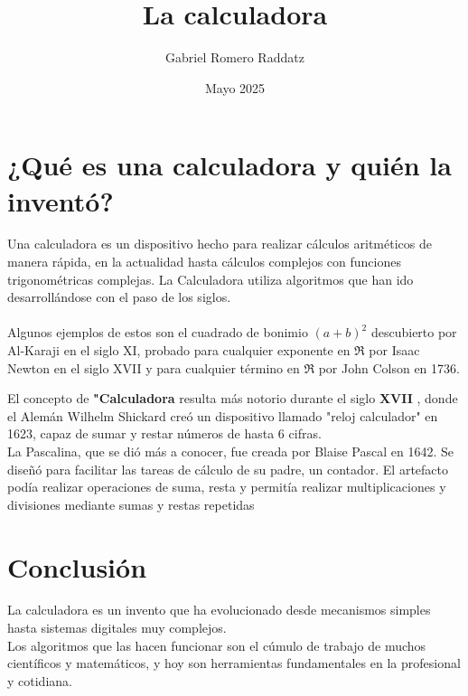 \documentclass[12pt]{article}
\title{\textbf{\huge La calculadora}}
\author{ Gabriel Romero Raddatz}
\date{Mayo 2025}
\begin{document}
\maketitle

\section{¿Qué es una calculadora y quién la inventó?}

\begin{lef}
    
Una calculadora es un dispositivo hecho para realizar cálculos aritméticos de manera rápida, en la actualidad hasta cálculos complejos con funciones trigonométricas complejas. La Calculadora utiliza algoritmos que han ido desarrollándose con el paso de los siglos. \\
\\
Algunos ejemplos de estos son el cuadrado de bonimio $(a+b)^{2}$  descubierto por Al-Karaji en el siglo XI, probado para cualquier exponente en $\Re$ por Isaac Newton en el siglo XVII y para cualquier término en $\Re$ por John Colson en 1736. 


El concepto de \textbf{"Calculadora} resulta más notorio durante el siglo \textbf{XVII }, donde el Alemán Wilhelm Shickard creó un dispositivo llamado "reloj calculador" en 1623, capaz de sumar y restar números de hasta 6 cifras. \\
La Pascalina, que se dió más a conocer, fue creada por Blaise Pascal en 1642. Se diseñó para facilitar las tareas de cálculo de su padre, un contador. El artefacto podía realizar operaciones de suma, resta y permitía realizar multiplicaciones y divisiones mediante sumas y restas repetidas




\section{Conclusión}
La calculadora es un invento que ha evolucionado desde mecanismos simples hasta sistemas digitales muy complejos. \\
Los algoritmos que las hacen funcionar son el cúmulo de trabajo de muchos científicos y matemáticos, y hoy son herramientas fundamentales en la profesional y cotidiana.

\end{lef}
\end{document}
